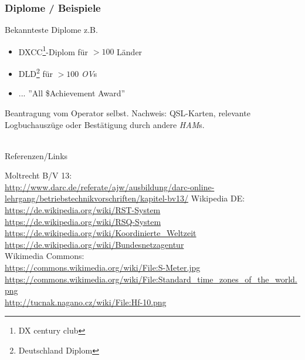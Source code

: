 \begin{frame}
    \frametitle{Diplome / Beispiele}

    Bekannteste Diplome z.B.

    \begin{itemize}
        \item DXCC\footnote{DX century club}-Diplom für $>100$ Länder
        \item DLD\footnote{Deutschland Diplom} für $>100$ \emph{OV}s
        \item ... ''All \$Achievement Award''
    \end{itemize}

    Beantragung vom Operator selbst. Nachweis: QSL-Karten, relevante
    Logbuchauszüge oder Bestätigung durch andere \emph{HAM}s.

\end{frame}

\renewcommand{\refname}{Referenzen}

\hypertarget{refs}{}
\textcolor{white}{} \\ %
\Large Referenzen/Links
\footnotesize

\begin{thebibliography}{}

     Moltrecht B/V 13: \\
                    \url{http://www.darc.de/referate/ajw/ausbildung/darc-online-lehrgang/betriebstechnikvorschriften/kapitel-bv13/}
        Wikipedia DE: \\
                    \url{https://de.wikipedia.org/wiki/RST-System}\\
                    \url{https://de.wikipedia.org/wiki/RSQ-System}\\
                    \url{https://de.wikipedia.org/wiki/Koordinierte_Weltzeit}\\
                    \url{https://de.wikipedia.org/wiki/Bundesnetzagentur}\\
        Wikimedia Commons: \\
                    \url{https://commons.wikimedia.org/wiki/File:S-Meter.jpg}\\
                    \url{https://commons.wikimedia.org/wiki/File:Standard_time_zones_of_the_world.png}\\
      \url{http://tucnak.nagano.cz/wiki/File:Hf-10.png}\\
\end{thebibliography} 


